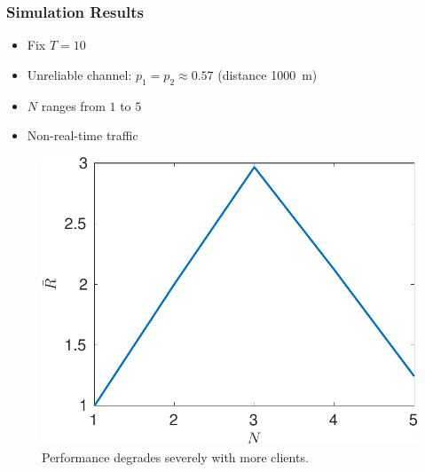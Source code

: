\documentclass{beamer}
\begin{document}
\begin{frame}
\frametitle{Simulation Results}
\begin{itemize}
  \item Fix $T=10$
\item Unreliable channel: $p_1 = p_2 \approx 0.57$ (distance \SI{1000}{m})
\item $N$ ranges from $1$ to $5$
\item Non-real-time traffic
\end{itemize}
\begin{figure}[htbp]
  \centering
  \includegraphics[height=.5\textheight]{nonrealtime_throughput_N.pdf}
  \caption{Performance degrades severely with more clients.}
\end{figure}
\end{frame}
\end{document}
